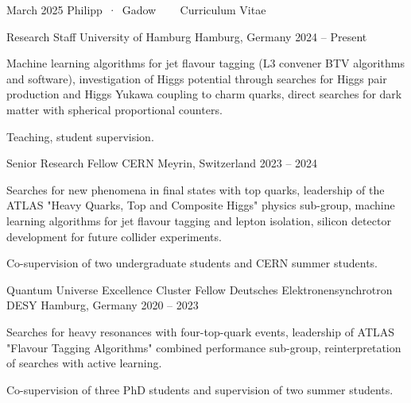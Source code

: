 \documentclass[11pt, letterpaper, draft]{academic-cv}
\begin{document}
\makecvheader

\makecvfooter
  {March 2025}
  {Philipp~·~Gadow ~~~ Curriculum Vitae}
  {\thepage}

\begin{cventries}

    \cventry
      {Research Staff} %
      {University of Hamburg} %
      {Hamburg, Germany} %
      {2024 -- Present} %
      {
        \begin{cvitems} %
          \item {Machine learning algorithms for jet flavour tagging (L3 convener BTV algorithms and software), investigation of Higgs potential through searches for Higgs pair production and Higgs Yukawa coupling to charm quarks, direct searches for dark matter with spherical proportional counters.}
          \item {Teaching, student supervision.}
        \end{cvitems}
      }

    \cventry
      {Senior Research Fellow} %
      {CERN} %
      {Meyrin, Switzerland} %
      {2023 -- 2024} %
      {
        \begin{cvitems} %
          \item {Searches for new phenomena in final states with top quarks, leadership of the ATLAS "Heavy Quarks, Top and Composite Higgs" physics sub-group, machine learning algorithms for jet flavour tagging and lepton isolation, silicon detector development for future collider experiments.}
          \item {Co-supervision of two undergraduate students and CERN summer students.}
        \end{cvitems}
      }
  
    \cventry
      {Quantum Universe Excellence Cluster Fellow} %
      {Deutsches Elektronensynchrotron DESY} %
      {Hamburg, Germany} %
      {2020 -- 2023} %
      {
        \begin{cvitems} %
          \item {Searches for heavy resonances with four-top-quark events, leadership of ATLAS "Flavour Tagging Algorithms" combined performance sub-group, reinterpretation of searches with active learning. }
          \item {Co-supervision of three PhD students and supervision of two summer students.}
        \end{cvitems}
      }
  

\end{cventries}
\end{document}
